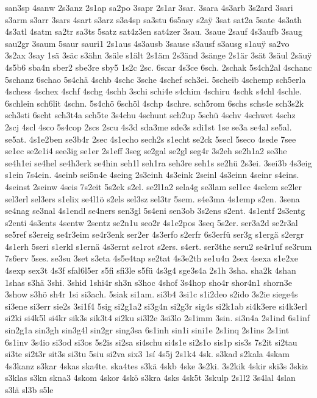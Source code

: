 {san3sp
4sanw
2s3anz
2s1ap
sa2po
3sapr
2s1ar
3sar.
3sara
4s3arb
3s2ard
3sari
s3arm
s3arr
3sars
4sart
s3arz
s3a4sp
sa3stu
6s5asy
s2a^^ff
3sat
sat2a
5sate
4s3ath
4s3atl
4satm
sa2tr
sa3ts
5satz
sat4z3en
sat4zer
3sau.
3saue
2sauf
4s3aufb
3saug
sau2gr
3saum
5saur
sauri1
2s1aus
4s3ausb
3sause
s3ausf
s3ausg
s1au^^ff
sa2vo
3s2ax
3say
1sä
3säc
s3ähn
3säle
s1ält
2s1äm
2s3änd
3sänge
2s1är
3sät
3säul
2säu^^ff
4s5b6
sba4n
sber2
sbe3re
sby5
1s2c
2sc.
6scar
4s3ce
6sch.
2schak
5s4ch2al
4schanc
5schanz
6schao
5s4chä
4schb
4schc
3sche
4schef
sch3ei.
5scheib
4schemp
sch5erla
4schess
4schex
4schf
4schg
4schh
3schi
schi4e
s4chim
4schiru
4schk
s4chl
4schle.
6schlein
sch6lit
4schn.
5s4chö
6schöl
4schp
4schre.
sch5rom
6schs
schs4e
sch3s2k
sch3sti
6scht
sch3t4a
sch5te
3s4chu
4schunt
sch2up
5schü
4schv
4schwet
4schz
2scj
4scl
4sco
5s4cop
2scs
2scu
4s3d
sda3me
sde3s
sdi1st
1se
se3a
se4al
se5al.
se5at.
4s1e2ben
se3b4r
2sec
4s1echo
sech2s
s1echt
se2ck
5secl
5seco
4sede
7see
se1ec
se2e1i4
see3ig
se1er
2s1eff
3seg
se2gal
se2gl
seg4r
3s2eh
se2h1a2
se3he
se4h1ei
se4hel
se4h3erk
se4hin
seh1l
seh1ra
seh3re
seh1s
se2hü
2s3ei.
3sei3b
4s3eig
s1ein
7s4ein.
4seinb
sei5n4e
4seing
2s3einh
4s3eink
2seinl
4s3einn
4seinr
s4eins.
4seinst
2seinw
4seis
7s2eit
5s2ek
s2el.
se2l1a2
sela4g
se3lam
sel1ec
4selem
se2ler
sel3erl
sel3ers
s1elix
se4l1ö
s2els
sel3sz
sel3tr
5sem.
s4e3ma
4s1emp
s2en.
3sena
se4nag
se3nal
4s1endl
se4ners
sen3gl
5s4eni
sen3ob
3s2ens
s2ent.
4s1entf
2s3entg
s2enti
4s3ents
4sentw
2sentz
se2n1u
seo2r
4s1e2pos
3seq
5s2er.
ser3a2d
se2r3al
se5ref
s3ereig
se4r3eim
se4r3enk
ser2er
4s3erfo
s2erfr
6s3erfü
ser3g
s1ergä
s2ergr
4s1erh
5seri
s1erkl
s1ernä
4s3ernt
se1rot
s2ers.
s4ert.
ser3the
seru2
se4r1uf
se3rum
7s6erv
5ses.
se3su
3set
s3eta
4s5e4tap
se2tat
4s3e2th
se1u4n
2sex
4sexa
s1e2xe
4sexp
sex3t
4s3f
sfal6l5er
s5fi
sfi3le
s5fü
4s3g4
sge3s4a
2s1h
3sha.
sha2k
4shan
1shas
s3hä
3shi.
3shid
1shi4r
sh3n
s3hoc
4shof
3s4hop
sho4r
shor4n1
shorn3e
3show
s3hö
sh4r
1si
si3ach.
5siak
si1am.
si3b4
3si1c
s1i2deo
s2ido
3s2ie
siege4s
si3ene
si3err
sie2s
3si1f4
5sig
si2g1a2
si3g4n
si2g3r
sig4s
si2k1ab
si4k3ere
si4k3erl
si2ki
si4k5l
si4kr
sik3s
sik3t4
si2ku
si3l2e
3si3lo
2s1imm
3sin.
si3n4a
2s1ind
6s1inf
sin2g1a
sin3gh
sin3g4l
sin2gr
sing3sa
6s1inh
sin1i
sini1e
2s1inq
2s1ins
2s1int
6s1inv
3s4io
si3od
si3os
5s2is
si2sa
si4schu
si4s1e
si2s1o
sis1p
sis3s
7s2it
si2tau
si3te
si2t3r
sit3s
si3tu
5siu
si2va
six3
1sí
4s5j
2s1k4
4sk.
s3kad
s2kala
4skam
4s3kanz
s3kar
4skas
ska4te.
ska4tes
s3kä
4skb
4ske
3s2ki.
3s2kik
4skir
ski3s
3skiz
s3klas
s3kn
skna3
4skom
4skor
4skö
s3kra
4sks
4sk5t
3skulp
2s1l2
3s4lal
4slan
s3lä
sl3b
s5le
}
